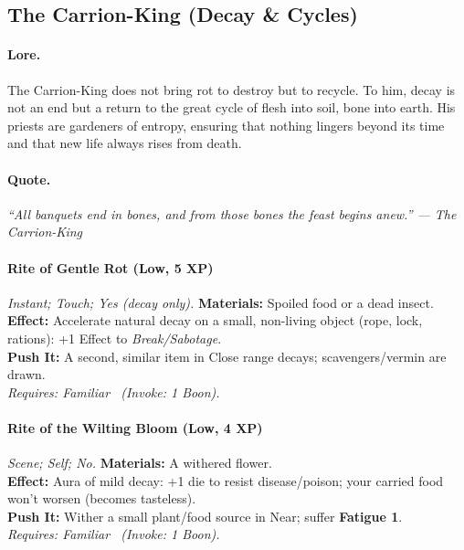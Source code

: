 \subsection{The Carrion-King (Decay \& Cycles)}

\paragraph{Lore.}
The Carrion-King does not bring rot to destroy but to recycle. To him, decay is not an end but a return to the great cycle of flesh into soil, bone into earth. His priests are gardeners of entropy, ensuring that nothing lingers beyond its time and that new life always rises from death.

\paragraph{Quote.}
\emph{“All banquets end in bones, and from those bones the feast begins anew.” — The Carrion-King}

\paragraph{Rite of Gentle Rot (Low, 5 XP)} \emph{Instant; Touch; Yes (decay only).}
\textbf{Materials:} Spoiled food or a dead insect. \\
\textbf{Effect:} Accelerate natural decay on a small, non-living object (rope, lock, rations): +1 Effect to \emph{Break/Sabotage}. \\
\textbf{Push It:} A second, similar item in Close range decays; scavengers/vermin are drawn. \\
\emph{Requires: Familiar \ (\textit{Invoke:} 1 Boon).}

\paragraph{Rite of the Wilting Bloom (Low, 4 XP)} \emph{Scene; Self; No.}
\textbf{Materials:} A withered flower. \\
\textbf{Effect:} Aura of mild decay: +1 die to resist disease/poison; your carried food won’t worsen (becomes tasteless). \\
\textbf{Push It:} Wither a small plant/food source in Near; suffer \textbf{Fatigue 1}. \\
\emph{Requires: Familiar \ (\textit{Invoke:} 1 Boon).}

